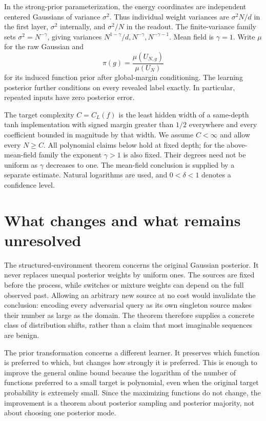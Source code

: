 \documentclass[11pt]{article}
\begin{document}
In the strong-prior parameterization, the energy coordinates are
independent centered Gaussians of variance $\sigma^2$. Thus individual
weight variances are $\sigma^2N/d$ in the first layer, $\sigma^2$ internally,
and $\sigma^2/N$ in the readout. The finite-variance family sets
$\sigma^2=N^{-\gamma}$, giving variances
$N^{1-\gamma}/d,N^{-\gamma},N^{-\gamma-1}$. Mean field is $\gamma=1$.
Write $\mu$ for the raw Gaussian and
\[
 \pi(g)=\frac{\mu(U_{N,g})}{\mu(U_N)}
\]
for its induced function prior after global-margin conditioning. The
learning posterior further conditions on every revealed label exactly.
In particular, repeated inputs have zero posterior error.

The target complexity $C=C_L(f)$ is the least hidden width of a same-depth
tanh implementation with signed margin greater than $1/2$ everywhere
and every coefficient bounded in magnitude by that width. We assume
$C<\infty$ and allow every $N\ge C$. All polynomial claims below hold at
fixed depth; for the above-mean-field family the exponent $\gamma>1$ is
also fixed. Their degrees need not be uniform as $\gamma$ decreases to
one. The mean-field conclusion is supplied by a separate estimate.
Natural logarithms are used, and $0<\delta<1$ denotes a confidence level.





\section{What changes and what remains unresolved}

The structured-environment theorem concerns the original Gaussian
posterior. It never replaces unequal posterior weights by uniform ones.
The sources are fixed before the process, while switches or mixture
weights can depend on the full observed past. Allowing an arbitrary new
source at no cost would invalidate the conclusion: encoding every
adversarial query as its own singleton source makes their number as large
as the domain. The theorem therefore supplies a concrete class of
distribution shifts, rather than a claim that most imaginable sequences
are benign.

The prior transformation concerns a different learner. It preserves which
function is preferred to which, but changes how strongly it is preferred.
This is enough to improve the general online bound because the
logarithm of the number of functions preferred to a small target is
polynomial, even when the original target probability is extremely small.
Since the maximizing functions do not change, the improvement is a
theorem about posterior sampling and posterior majority, not about
choosing one posterior mode.
\end{document}
